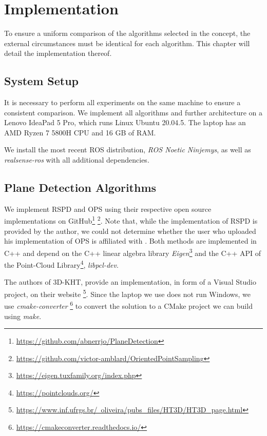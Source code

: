 \documentclass[main.tex]{subfiles}
\begin{document}
\chapter{Implementation}
To ensure a uniform comparison of the algorithms selected in the concept, the external circumstances
must be identical for each algorithm. This chapter will detail the implementation thereof.

\section{System Setup}
It is necessary to perform all experiments on the same machine to ensure a consistent comparison.
We implement all algorithms and further architecture on a Lenovo IdeaPad 5 Pro,
which runs Linux Ubuntu 20.04.5. The laptop has an AMD Ryzen 7 5800H CPU and 16 GB of RAM.

We install the most recent ROS distribution, \textit{ROS Noetic Ninjemys}, as well as \textit{realsense-ros} with all additional dependencies.


\section{Plane Detection Algorithms}
We implement RSPD and OPS using their respective open source implementations on GitHub\footnote{\href{https://github.com/abnerrjo/PlaneDetection}{{https://github.com/abnerrjo/PlaneDetection}}}
\footnote{\href{https://github.com/victor-amblard/OrientedPointSampling}{https://github.com/victor-amblard/OrientedPointSampling}}. Note that, while the implementation of RSPD is provided by the author,
we could not determine whether the user who uploaded his implementation of OPS is affiliated with \citeauthor{Sun_Mordohai_2019}.
Both methods are implemented in C++ and depend on the C++ linear algebra library \textit{Eigen}\footnote{\href{https://eigen.tuxfamily.org/index.php}{https://eigen.tuxfamily.org/index.php}}
and the C++ API of the  Point-Cloud Library\footnote{\href{https://pointclouds.org/}{https://pointclouds.org/}}, \textit{libpcl-dev}.

The authors of 3D-KHT, provide an implementation, in form of a Visual Studio project, on their website \footnote{\href{https://www.inf.ufrgs.br/~oliveira/pubs_files/HT3D/HT3D_page.html}
    {https://www.inf.ufrgs.br/~oliveira/pubs\_files/HT3D/HT3D\_page.html}}. Since the laptop we use does not run Windows, we use \textit{cmake-converter}
\footnote{\href{https://cmakeconverter.readthedocs.io/en/latest/use.html}{https://cmakeconverter.readthedocs.io/}} to convert
the solution to a CMake project we can build using \textit{make}.
\end{document}
